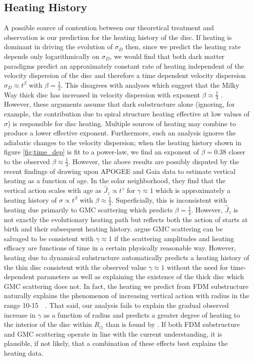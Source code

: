 \documentclass[usenatbib]{mnras}
\begin{document}
\subsection{Heating History}
A possible source of contention between our theoretical treatment and observation is our prediction for the heating history of the disc. If heating is dominant in driving the evolution of $\sigma_D$ then, since we predict the heating rate depends only logarithmically on $\sigma_D$, we would find that both dark matter paradigms predict an approximately constant rate of heating independent of the velocity dispersion of the disc and therefore a time dependent velocity dispersion $\sigma_D \approx t^{\beta}$ with $\beta = \tfrac{1}{2}$. This disagrees with analyses which suggest that the Milky Way thick disc has increased in velocity dispersion with exponent $\beta \approx \tfrac{1}{3}$ \citep{heating_history}. However, these arguments assume that dark substructure alone (ignoring, for example, the contribution due to spiral structure heating effective at low values of $\sigma$) is responsible for disc heating. Multiple sources of heating may combine to produce a lower effective exponent. Furthermore, such an analysis ignores the adiabatic changes to the velocity dispersion; when the heating history shown in figure \ref{fig:time_dep} is fit to a power-law, we find an exponent of $\beta = 0.38$ closer to the observed $\beta \approx \frac{1}{3}$. However, the above results are possibly disputed by the recent findings of \cite{Gaia_vertical_motions} drawing upon APOGEE and Gaia data to estimate vertical heating as a function of age. In the solar neighborhood, they find that the vertical action scales with age as $\widehat{J}_z \propto t^{\gamma}$ for $\gamma \approx 1$ which is approximately a heating history of $\sigma \propto t^\beta$ with $\beta \approx \frac{1}{2}$. Superficially, this is inconsistent with heating due primarily to GMC scattering which predicts $\beta = \frac{1}{4}$. However, $\widehat{J}_z$ is not exactly the evolutionary heating path but reflects both the action of starts at birth and their subsequent heating history. \cite{Gaia_vertical_motions} argue GMC scattering can be salvaged to be consistent with $\gamma \approx 1$ if the scattering amplitudes and heating efficacy are functions of time in a certain physically reasonable way. However, heating due to dynamical substructure automatically predicts a heating history of the thin disc consistent with the observed value $\gamma \approx 1$ without the need for time-dependent parameters as well as explaining the existence of the thick disc which GMC scattering does not. In fact, the heating we predict from FDM substructure naturally explains the phenomenon of increasing vertical action with radius in the range 10-\SI{15}{\kilo \parsec}. 
That said, our analysis fails to explain the gradual observed increase in $\gamma$ as a function of radius and predicts a greater degree of heating to the interior of the disc within $R_{\odot}$ than is found by \cite{Gaia_vertical_motions}. If both FDM substructure and GMC scattering operate in line with the current understanding, it is plausible, if not likely, that a combination of these effects best explains the heating data.
\end{document}
